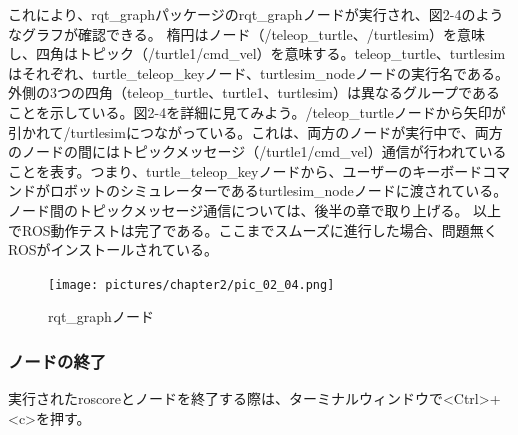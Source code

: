 これにより、rqt\_graphパッケージのrqt\_graphノードが実行され、図2-4のようなグラフが確認できる。
楕円はノード（/teleop\_turtle、/turtlesim）を意味し、四角はトピック（/turtle1/cmd\_vel）を意味する。teleop\_turtle、turtlesim はそれぞれ、turtle\_teleop\_keyノード、turtlesim\_nodeノードの実行名である。外側の3つの四角（teleop\_turtle、turtle1、turtlesim）は異なるグループであることを示している。図2-4を詳細に見てみよう。/teleop\_turtleノードから矢印が引かれて/turtlesimにつながっている。これは、両方のノードが実行中で、両方のノードの間にはトピックメッセージ（/turtle1/cmd\_vel）通信が行われていることを表す。つまり、turtle\_teleop\_keyノードから、ユーザーのキーボードコマンドがロボットのシミュレーターであるturtlesim\_nodeノードに渡されている。ノード間のトピックメッセージ通信については、後半の章で取り上げる。
以上でROS動作テストは完了である。ここまでスムーズに進行した場合、問題無くROSがインストールされている。

\begin{figure}[h]
  \centering
  \texttt{[image: pictures/chapter2/pic\_02\_04.png]}
  \caption{rqt\_graphノード}
\end{figure}

\subsubsection{ノードの終了}
実行されたroscoreとノードを終了する際は、ターミナルウィンドウで<Ctrl>+<c>を押す。

